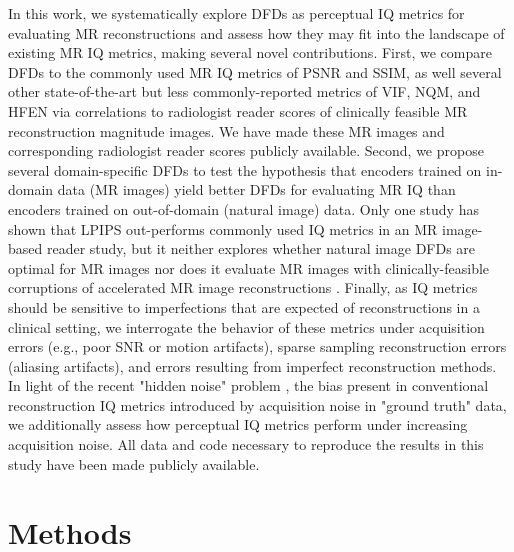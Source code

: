 \documentclass[AMA,STIX2COL,Linenumberson]{MRM}
\begin{document}
In this work, we systematically explore DFDs as perceptual IQ metrics for evaluating MR reconstructions and assess how they may fit into the landscape of existing MR IQ metrics, making several novel contributions. First, we compare DFDs to the commonly used MR IQ metrics of PSNR and SSIM, as well several other state-of-the-art but less commonly-reported metrics of VIF, NQM, and HFEN via correlations to radiologist reader scores of clinically feasible MR reconstruction magnitude images. We have made these MR images and corresponding radiologist reader scores publicly available. Second, we propose several domain-specific DFDs to test the hypothesis that encoders trained on in-domain data (MR images) yield better DFDs for evaluating MR IQ than encoders trained on out-of-domain (natural image) data.  Only one study has shown that LPIPS out-performs commonly used IQ metrics in an MR image-based reader study, but it neither explores whether natural image DFDs are optimal for MR images nor does it evaluate MR images with clinically-feasible corruptions of accelerated MR image reconstructions \cite{kastryulin2023image}. Finally, as IQ metrics should be sensitive to imperfections that are expected of reconstructions in a clinical setting, we interrogate the behavior of these metrics under acquisition errors (e.g., poor SNR or motion artifacts), sparse sampling reconstruction errors (aliasing artifacts), and errors resulting from imperfect reconstruction methods. In light of the recent "hidden noise" problem \cite{wang2024hidden}, the bias present in conventional reconstruction IQ metrics introduced by acquisition noise in "ground truth" data, we additionally assess how perceptual IQ metrics perform under increasing acquisition noise. All data and code necessary to reproduce the results in this study have been made publicly available.


\section{Methods}
\end{document}
